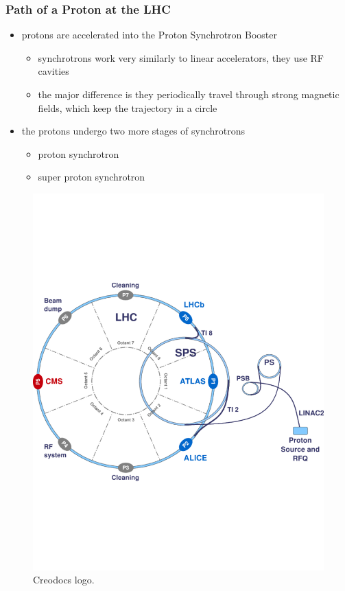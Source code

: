 \documentclass[
	11pt, %
]{beamer}
\begin{document}
\begin{frame}
\frametitle{Path of a Proton at the LHC}
\begin{itemize}
	\item protons are accelerated into the Proton Synchrotron Booster
	\begin{itemize} 
		\item synchrotrons work very similarly to linear accelerators, they use RF cavities
		\item the major difference is they periodically travel through strong magnetic fields, which keep the 			trajectory in a circle
	\end{itemize}
	\item the protons undergo two more stages of synchrotrons
	\begin{itemize} 
		\item proton synchrotron
		\item super proton synchrotron
	\end{itemize}
\end{itemize}
\begin{figure}
	\vspace*{-2cm}
	 \hspace*{0cm}
	\includegraphics[scale=.3]{cern_map.pdf}
	\caption{Creodocs logo.}
\end{figure}
\end{frame}
\end{document}
